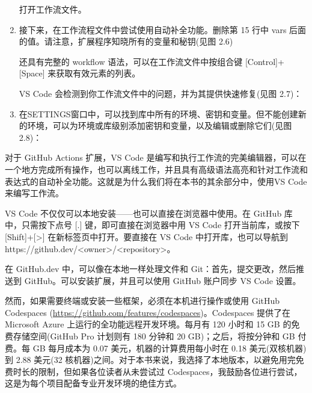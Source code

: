 \begin{enumerate}

打开工作流文件。

\item 
接下来，在工作流程文件中尝试使用自动补全功能。删除第 15 行中 vars 后面的值。请注意，扩展程序知晓所有的变量和秘钥(见图 2.6)


还具有完整的 workflow 语法，可以在工作流文件中按组合键 [Control]+[Space] 来获取有效元素的列表。

VS Code 会检测到你工作流文件中的问题，并为其提供快速修复(见图 2.7)：


\item 
在SETTINGS窗口中，可以找到库中所有的环境、密钥和变量。但不能创建新的环境，可以为环境或库级别添加密钥和变量，以及编辑或删除它们(见图 2.8)：


\end{enumerate}


对于 GitHub Actions 扩展，VS Code 是编写和执行工作流的完美编辑器，可以在一个地方完成所有操作，也可以离线工作，并且具有高级语法高亮和针对工作流和表达式的自动补全功能。这就是为什么我们将在本书的其余部分中，使用VS Code来编写工作流。


VS Code 不仅仅可以本地安装——也可以直接在浏览器中使用。在 GitHub 库中，只需按下点号 [.] 键，即可直接在浏览器中用 VS Code 打开当前库，或按下 [Shift]+[>] 在新标签页中打开。要直接在 VS Code 中打开库，也可以导航到https://github.dev/<owner>/<repository>。

在 GitHub.dev 中，可以像在本地一样处理文件和 Git：首先，提交更改，然后推送到 GitHub。可以安装扩展，并且可以使用 GitHub 账户同步 VS Code 设置。

然而，如果需要终端或安装一些框架，必须在本机进行操作或使用 GitHub Codespaces (\url{https://github.com/features/codespaces})。Codespaces 提供了在 Microsoft Azure 上运行的全功能远程开发环境。每月有 120 小时和 15 GB 的免费存储空间(GitHub Pro 计划则有 180 分钟和 20 GB)；之后，将按分钟和 GB 付费。每 GB 每月成本为 0.07 美元，机器的计算费用每小时在 0.18 美元(双核机器)到 2.88 美元(32 核机器)之间。对于本书来说，我选择了本地版本，以避免用完免费时长的限制，但如果各位读者从未尝试过 Codespaces，我鼓励各位进行尝试，这是为每个项目配备专业开发环境的绝佳方式。